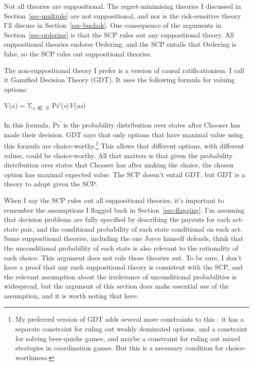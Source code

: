 \documentclass[
  11pt,
  letterpaper,
  DIV=11,
  numbers=noendperiod,
  twoside]{scrartcl}
\providecommand{\tightlist}{%
  \setlength{\itemsep}{0pt}\setlength{\parskip}{0pt}}\usepackage{longtable,booktabs,array}
\begin{document}
Not all theories are suppositional. The regret-minimising theories I
discussed in Section~\ref{sec-multiple} are not suppositional, and nor
is the risk-sensitive theory I'll discuss in Section~\ref{sec-buchak}.
One consequence of the arguments in Section~\ref{sec-ordering} is that
the SCP rules out any suppositional theory. All suppositional theories
endorse Ordering, and the SCP entails that Ordering is false, so the SCP
rules out suppositional theories.

The non-suppositional theory I prefer is a version of causal
ratificationism. I call it Gamified Decision Theory (GDT). It uses the
following formula for valuing options:

\begin{description}
\tightlist
\item[GDT]
V(a) =
Σ\textsubscript{\emph{s}~∈~\emph{S}}~Pr′(\emph{s})\emph{V}(\emph{as})
\end{description}

In this formula, Pr\textsuperscript{′} is the probability distribution
over states after Chooser has made their decision. GDT says that only
options that have maximal value using this formula are
choice-worthy.\footnote{My preferred version of GDT adds several more
  constraints to this - it has a separate constraint for ruling out
  weakly dominated options, and a constraint for solving beer-quiche
  games, and maybe a constraint for ruling out mixed strategies in
  coordination games. But this is a necessary condition for
  choice-worthiness.} This allows that different options, with different
values, could be choice-worthy. All that matters is that given the
probability distribution over states that Chooser has after making the
choice, the chosen option has maximal expected value. The SCP doesn't
entail GDT, but GDT is a theory to adopt given the SCP.

When I say the SCP rules out all suppositional theories, it's important
to remember the assumptions I flagged back in
Section~\ref{sec-flagging}. I'm assuming that decision problems are
fully specified by describing the payouts for each act-state pair, and
the conditional probability of each state conditional on each act. Some
suppositional theories, including the one Joyce himself defends, think
that the unconditional probability of each state is also relevant to the
rationality of each choice. This argument does not rule those theories
out. To be sure, I don't have a proof that any such suppositional theory
is consistent with the SCP, and the relevant assumption about the
irrelevance of unconditional probabilities is widespread, but the
argument of this section does make essential use of the assumption, and
it is worth noting that here.
\end{document}
